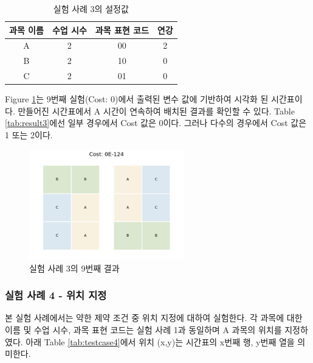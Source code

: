 \documentclass{article}
\begin{document}
    \begin{table}[htb!]
        \centering
        \begin{tabular}{c c c c}
             \hline
             과목 이름 & 수업 시수 & 과목 표현 코드 & 연강\\
             \hline
             A & 2 & 00 & 2\\
             B & 2 & 10 & 0\\
             C & 2 & 01 & 0\\
             \hline
        \end{tabular}
        \caption{실험 사례 3의 설정값}\label{tab:testcase3}
    \end{table}

Figure \ref{fig:case3}는 9번째 실험(Cost: 0)에서 출력된 변수 값에 기반하여 시각화 된 시간표이다. 만들어진 시간표에서 A 시간이 연속하여 배치된 결과를 확인할 수 있다. Table \ref{tab:result3}에선 일부 경우에서 Cost 값은 0이다. 그러나 다수의 경우에서 Cost 값은 1 또는 2이다. 

    \begin{figure}[ht]
        \centering
        \includegraphics[width=0.6\textwidth]{images/Case3.png}
        \caption{실험 사례 3의 9번째 결과}
        \label{fig:case3}
    \end{figure}
    \newpage  %

    \subsubsection{실험 사례 4 - 위치 지정}

본 실험 사례에서는 약한 제약 조건 중 위치 지정에 대하여 실험한다. 각 과목에 대한 이름 및 수업 시수, 과목 표현 코드는 실험 사례 1과 동일하며 A 과목의 위치를 지정하였다. 아래 Table \ref{tab:testcase4}에서 위치 (x,y)는 시간표의 x번째 행, y번째 열을 의미한다.
\end{document}
